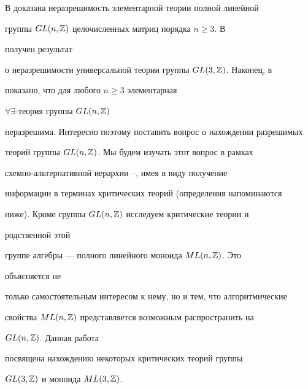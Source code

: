  


\pagestyle{plain} %


 


 




 


\maketitle 


\label{begin} 


 


В \cite{1} доказана неразрешимость элементарной теории полной линейной 


группы $GL(n,\Bbb Z)$ целочисленных матриц порядка $n\ge 3$. В \cite{2} 


получен результат 


о неразрешимости универсальной теории группы $GL(3,\Bbb Z)$. Наконец, в 


\cite{3} показано, что для любого $n\ge 3$ элементарная 


$\forall\exists$-теория группы $GL(n,\Bbb Z)$ 


неразрешима. Интересно поэтому поставить вопрос о нахождении разрешимых 


теорий группы $GL(n,\Bbb Z)$. Мы будем изучать этот вопрос в рамках 


схемно-альтернативной иерархии \cite{4}--\cite{6}, имея в виду получение 


информации в терминах критических теорий (определения напоминаются 


ниже). Кроме группы $GL(n,\Bbb Z)$ исследуем критические теории и 


родственной этой 


группе алгебры --- полного линейного моноида $ML(n,\Bbb Z)$. Это 


объясняется не 


только самостоятельным интересом к нему, но и тем, что алгоритмические 


свойства $ML(n,\Bbb Z)$ представляется возможным распространить на 


$GL(n,\Bbb Z)$. Данная работа 


посвящена нахождению некоторых критических теорий группы 


$GL(3,\Bbb Z)$ и моноида $ML(3,\Bbb Z)$. 


